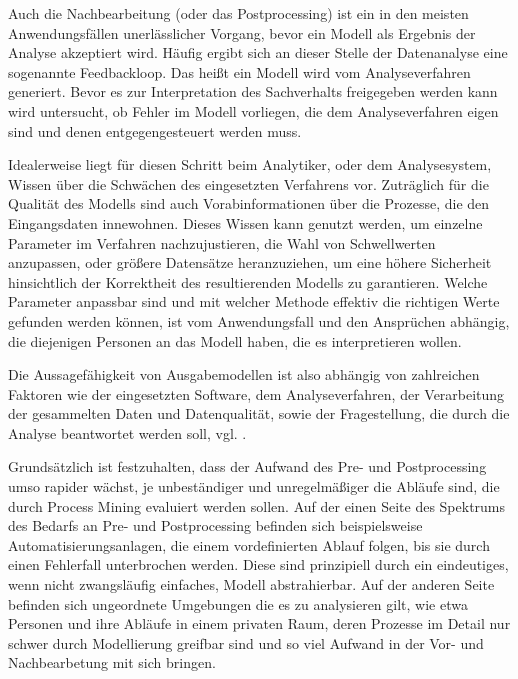 Auch die Nachbearbeitung (oder das Postprocessing) ist ein in den meisten Anwendungsfällen unerlässlicher Vorgang, bevor ein  Modell als Ergebnis der Analyse akzeptiert wird. Häufig ergibt sich an dieser Stelle der Datenanalyse eine sogenannte Feedbackloop. Das heißt ein Modell wird vom Analyseverfahren generiert. Bevor es zur Interpretation des Sachverhalts freigegeben werden kann wird untersucht, ob Fehler im Modell vorliegen, die dem Analyseverfahren eigen sind und denen entgegengesteuert werden muss. 

Idealerweise liegt für diesen Schritt beim Analytiker, oder dem Analysesystem, Wissen über die Schwächen des eingesetzten Verfahrens vor. Zuträglich für die Qualität des Modells sind auch Vorabinformationen über die Prozesse, die den Eingangsdaten innewohnen. Dieses Wissen kann genutzt werden, um einzelne Parameter im Verfahren nachzujustieren, die Wahl von Schwellwerten anzupassen, oder größere Datensätze heranzuziehen, um eine höhere Sicherheit hinsichtlich der Korrektheit des resultierenden Modells zu garantieren. Welche Parameter anpassbar sind und mit welcher Methode effektiv die richtigen Werte gefunden werden können, ist vom Anwendungsfall und den Ansprüchen abhängig, die diejenigen Personen an das Modell haben, die es interpretieren wollen. 

Die Aussagefähigkeit von Ausgabemodellen ist also abhängig von zahlreichen Faktoren wie der eingesetzten Software, dem Analyseverfahren, der Verarbeitung der gesammelten Daten und Datenqualität, sowie der Fragestellung, die durch die Analyse beantwortet werden soll, vgl. \cite{PMinAction}.

Grundsätzlich ist festzuhalten, dass der Aufwand des Pre- und Postprocessing umso rapider wächst, je unbeständiger und unregelmäßiger die Abläufe sind, die durch Process Mining evaluiert werden sollen. Auf der einen Seite des Spektrums des Bedarfs an Pre- und Postprocessing befinden sich  beispielsweise Automatisierungsanlagen, die einem vordefinierten Ablauf folgen, bis sie durch einen Fehlerfall unterbrochen werden. Diese sind prinzipiell durch ein eindeutiges, wenn nicht zwangsläufig einfaches, Modell abstrahierbar. Auf der anderen Seite befinden sich ungeordnete Umgebungen die es zu analysieren gilt, wie etwa Personen und ihre Abläufe in einem privaten Raum, deren Prozesse im Detail nur schwer durch Modellierung greifbar sind und so viel Aufwand in der Vor- und Nachbearbetung mit sich bringen. 